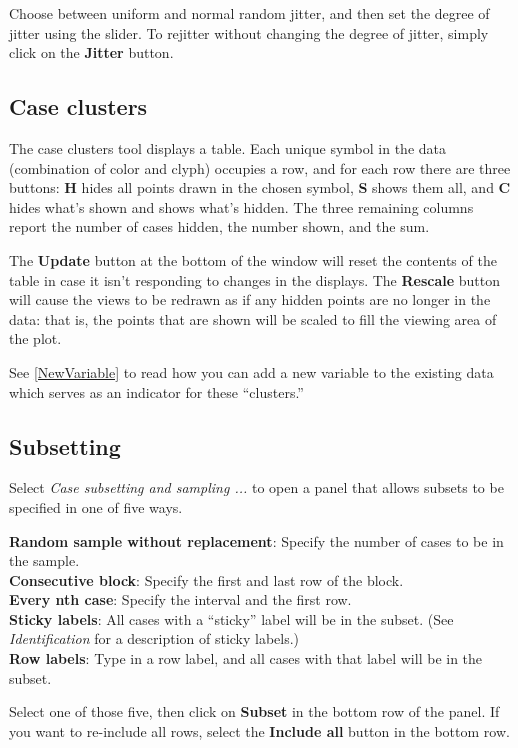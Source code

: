\documentclass[11pt]{article}
\begin{document}
Choose between uniform and normal random jitter, and then set the degree of
jitter using the slider.  To rejitter without changing the degree of
jitter, simply click on the {\bf Jitter} button.

\subsection{Case clusters}

The case clusters tool displays a table.  Each unique
symbol in the data (combination of color and clyph) occupies
a row, and for each row there are three buttons:  {\bf H}
hides all points drawn in the chosen symbol, {\bf S} shows
them all, and {\bf C} hides what's shown and shows what's
hidden.  The three remaining columns report the number of
cases hidden, the number shown, and the sum.

The {\bf Update} button at the bottom of the window will reset
the contents of the table in case it isn't responding to changes
in the displays.  The {\bf Rescale} button will cause the views
to be redrawn as if any hidden points are no longer in the data:
that is, the points that are shown will be scaled to fill the
viewing area of the plot.

See \ref{NewVariable} to read how you can add a new variable to the
existing data which serves as an indicator for these ``clusters.''

\subsection{Subsetting}

Select {\em Case subsetting and sampling ...} to open a panel
that allows subsets to be specified in one of five ways.

{\bf Random sample without replacement}:  Specify the number of
cases to be in the sample.
\\{\bf Consecutive block}:  Specify the first and last row of the block.
\\{\bf Every nth case}:  Specify the interval and the first row.
\\{\bf Sticky labels}:  All cases with a ``sticky'' label will
  be in the subset.  (See {\em Identification} for a description
  of sticky labels.)
\\{\bf Row labels}: Type in a row label, and all cases with that
  label will be in the subset.

Select one of those five, then click on {\bf Subset} in the
bottom row of the panel.  If you want to re-include all rows, 
select the {\bf Include all} button in the bottom row.
\end{document}

